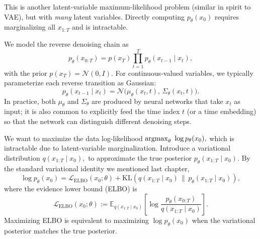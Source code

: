 \documentclass[../main]{subfiles}
\begin{document}

\begin{note}
This is another latent-variable maximum-likelihood problem (similar in spirit to VAE), but with \emph{many} latent variables.
Directly computing $p_\theta(x_0)$ requires marginalizing all $x_{1:T}$ and is intractable.
\end{note}

We model the reverse denoising chain as
\begin{equation}
    p_\theta(x_{0:T})
    = p(x_T)\prod_{t=1}^{T} p_\theta(x_{t-1}\mid x_t),
\end{equation}
with the {prior} $p(x_T)=\mathcal N(0,I).$
For continuous-valued variables, we typically parameterize each reverse transition as Gaussian:
\begin{equation}
    p_\theta(x_{t-1}\mid x_t)
    = \mathcal N\!\bigl(\mu_\theta(x_t,t),\, \Sigma_\theta(x_t,t)\bigr).
\end{equation}
In practice, both $\mu_\theta$ and $\Sigma_\theta$ are produced by neural networks that take $x_t$ as input;
it is also common to explicitly feed the time index $t$ (or a time embedding) so that the network can distinguish
different denoising steps.

We want to maximize the data log-likelihood $\mathop{\mathrm{argmax}}_\theta\ \log p_\theta(x_0),$
which is intractable due to latent-variable marginalization.
Introduce a variational distribution $q(x_{1:T}\mid x_0),$
to approximate the true posterior $p_\theta(x_{1:T}\mid x_0)$.
By the standard variational identity we mentioned last chapter,
\begin{equation}
    \log p_\theta(x_0)
    = \mathcal L_{\mathrm{ELBO}}(x_0;\theta)
      + \mathrm{KL}\!\left(q(x_{1:T}\mid x_0)\,\|\,p_\theta(x_{1:T}\mid x_0)\right),
\end{equation}
where the evidence lower bound (ELBO) is
\begin{equation}
    \mathcal L_{\mathrm{ELBO}}(x_0;\theta)
    := \mathbb E_{q(x_{1:T}\mid x_0)}\!\left[
        \log \frac{p_\theta(x_{0:T})}{q(x_{1:T}\mid x_0)}
    \right].
\end{equation}
Maximizing ELBO is equivalent to maximizing $\log p_\theta(x_0)$ when the variational posterior matches the true posterior.
\end{document}
